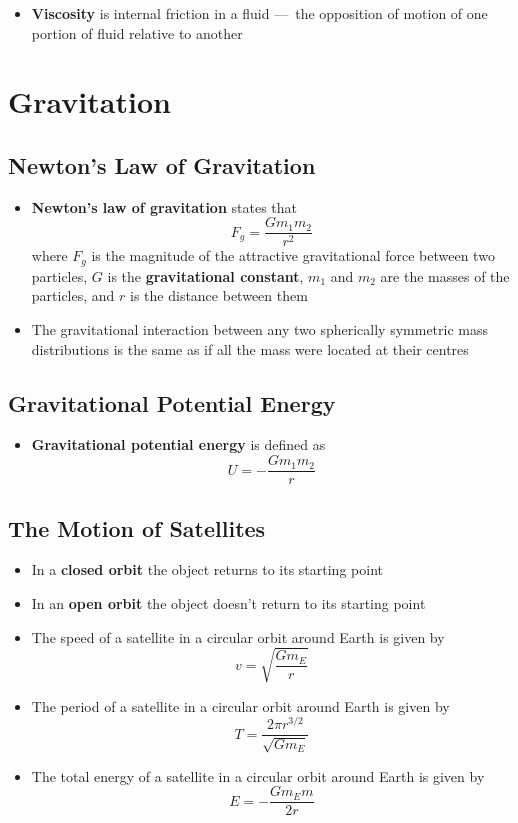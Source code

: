 \documentclass{article}
\begin{document}
\begin{itemize}
  \item \textbf{Viscosity} is internal friction in a fluid — the opposition of motion of one portion of fluid relative to another
\end{itemize}

\section{Gravitation}

\subsection{Newton's Law of Gravitation}

\begin{itemize}
  \item \textbf{Newton's law of gravitation} states that \[F_g=\frac{Gm_1m_2}{r^2}\] where $F_g$ is the magnitude of the attractive gravitational force between two particles, $G$ is the \textbf{gravitational constant}, $m_1$ and $m_2$ are the masses of the particles, and $r$ is the distance between them

  \item The gravitational interaction between any two spherically symmetric mass distributions is the same as if all the mass were located at their centres
\end{itemize}

\subsection{Gravitational Potential Energy}

\begin{itemize}
  \item \textbf{Gravitational potential energy} is defined as \[U=-\frac{Gm_1m_2}{r}\]
\end{itemize}

\setcounter{subsection}{3}
\subsection{The Motion of Satellites}

\begin{itemize}
  \item In a \textbf{closed orbit} the object returns to its starting point

  \item In an \textbf{open orbit} the object doesn't return to its starting point

  \item The speed of a satellite in a circular orbit around Earth is given by \[v=\sqrt{\frac{Gm_E}{r}}\]

  \item The period of a satellite in a circular orbit around Earth is given by \[T=\frac{2\pi r^{3/2}}{\sqrt{Gm_E}}\]

  \item The total energy of a satellite in a circular orbit around Earth is given by \[E=-\frac{Gm_Em}{2r}\]
\end{itemize}
\end{document}
